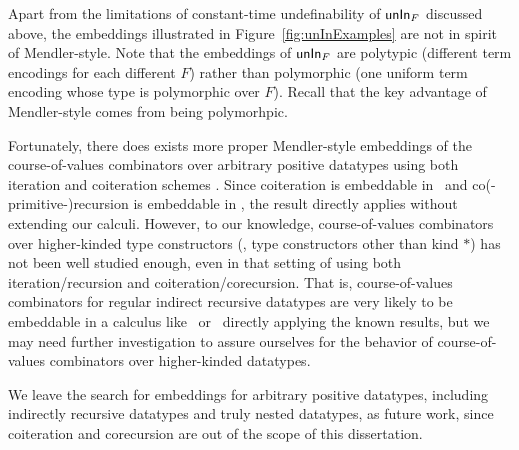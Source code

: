 Apart from the limitations of constant-time undefinability of $\mathsf{unIn}_F$
discussed above, the embeddings illustrated in Figure~\ref{fig:unInExamples}
are not in spirit of Mendler-style. Note that the embeddings of $\mathsf{unIn}_F$ are
polytypic (different term encodings for each different $F$) rather than
polymorphic (one uniform term encoding whose type is polymorphic over $F$).
Recall that the key advantage of Mendler-style comes from being polymorhpic.

Fortunately, there does exists more proper Mendler-style embeddings
of the course-of-values combinators over arbitrary positive datatypes
using both iteration and coiteration schemes \cite{TODO}. Since coiteration
is embeddable in \Fi\ and co(-primitive-)recursion is embeddable in \Fixi,
the result directly applies without extending our calculi. However,
to our knowledge, course-of-values combinators over higher-kinded
type constructors (\ie, type constructors other than kind $*$) has not been
well studied enough, even in that setting of using both iteration/recursion
and coiteration/corecursion. That is, course-of-values combinators for
regular indirect recursive datatypes are very likely to be embeddable in
a calculus like \Fi\ or \Fixi\ directly applying the known results, but
we may need further investigation to assure ourselves for the behavior of
course-of-values combinators over higher-kinded datatypes.

We leave the search for embeddings for arbitrary positive datatypes,
including indirectly recursive datatypes and truly nested datatypes,
as future work, since coiteration and corecursion are out of the scope of
this dissertation.


